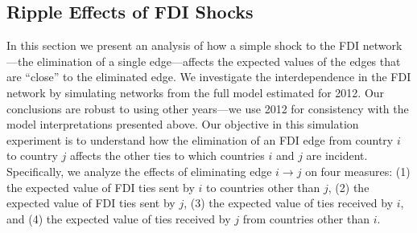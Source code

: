 \documentclass[reqno,onecolumn,letterpaper,12pt]{article}
\begin{document}
\subsection{Ripple Effects of FDI Shocks}\label{contagion}


In this section we present an analysis of how a simple shock to the FDI network---the elimination of a single edge---affects the expected values of the edges that are ``close'' to the eliminated edge. %
We investigate the interdependence in the FDI network by simulating networks from the full model estimated for 2012. Our conclusions are robust to using other years---we use 2012 for consistency with the model interpretations presented above. Our objective in this simulation experiment is to understand how the elimination of an FDI edge from country $i$ to country $j$ affects the other ties to which countries $i$ and $j$ are incident. Specifically, we analyze the effects of eliminating edge $i \rightarrow j$  on four measures: (1) the expected value of FDI ties sent by $i$ to countries other than $j$, (2) the expected value of FDI ties sent by $j$, (3) the expected value of ties received by $i$, and (4) the expected value of ties received by $j$ from countries other than $i$.  %
\end{document}
